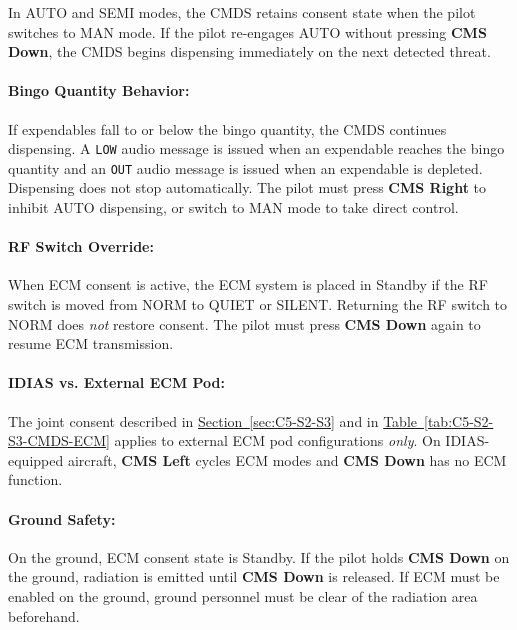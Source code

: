 \documentclass[11pt, a4paper, twoside]{report}
\newcommand{\secref}[1]{\hyperref[#1]{Section~\ref*{#1}}}
\newcommand{\tabref}[1]{\hyperref[#1]{Table~\ref*{#1}}}
\begin{document}
In AUTO and SEMI modes, the CMDS retains consent state when the pilot switches to MAN mode. If the pilot re-engages AUTO without pressing \textbf{CMS Down}, the CMDS begins dispensing immediately on the next detected threat.

\paragraph{Bingo Quantity Behavior:}

If expendables fall to or below the bingo quantity, the CMDS continues dispensing. A \texttt{LOW} audio message is issued when an expendable reaches the bingo quantity and an \texttt{OUT} audio message is issued when an expendable is depleted. Dispensing does not stop automatically. The pilot must press \textbf{CMS Right} to inhibit AUTO dispensing, or switch to MAN mode to take direct control.

\paragraph{RF Switch Override:}

When ECM consent is active, the ECM system is placed in Standby if the RF switch is moved from NORM to QUIET or SILENT. Returning the RF switch to NORM does \textit{not} restore consent. The pilot must press \textbf{CMS Down} again to resume ECM transmission.

\paragraph{IDIAS vs. External ECM Pod:}

The joint consent described in \secref{sec:C5-S2-S3} and in \tabref{tab:C5-S2-S3-CMDS-ECM} applies to external ECM pod configurations \textit{only}. On IDIAS-equipped aircraft, \textbf{CMS Left} cycles ECM modes and \textbf{CMS Down} has no ECM function.

\paragraph{Ground Safety:}

On the ground, ECM consent state is Standby. If the pilot holds \textbf{CMS Down} on the ground, radiation is emitted until \textbf{CMS Down} is released. If ECM must be enabled on the ground, ground personnel must be clear of the radiation area beforehand.

\end{document}
